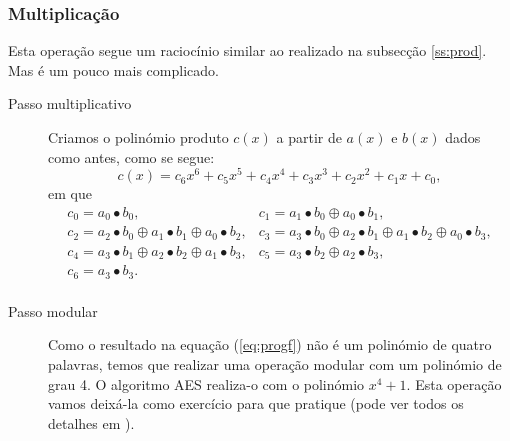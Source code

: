 \subsubsection{Multiplicação}\label{ss:prodraro}
Esta operação segue um raciocínio similar ao realizado na subsecção \ref{ss:prod}. Mas é um pouco mais complicado.
\begin{description}
\item[Passo multiplicativo] Criamos o polinómio produto $c(x)$ a partir de $a(x)$ e $b(x)$ dados como antes, como se segue:
$$
c(x)=c_6x^6+c_5x^5+c_4 x^4+c_3 x^3 +c_2 x^2 +c_1 x+c_0,
$$
em que
\begin{equation}\label{eq:progf}
\begin{array}{ll}
c_0= a_0 \bullet b_0, & c_1=a_1\bullet b_0 \oplus a_0 \bullet b_1,\\
c_2=a_2\bullet b_0 \oplus a_1 \bullet b_1 \oplus a_0 \bullet b_2 , & c_3= a_3\bullet b_0 \oplus a_2 \bullet b_1 \oplus a_1 \bullet b_2 \oplus a_0\bullet b_3,\\
c_4=a_3\bullet b_1 \oplus a_2 \bullet b_2 \oplus a_1 \bullet b_3, &  c_5=a_3\bullet b_2 \oplus a_2 \bullet b_3,\\
c_6=a_3\bullet b_3. & \\   
\end{array}
\end{equation}
\item[Passo modular] Como o resultado na equação (\ref{eq:progf}) não é um polinómio de quatro palavras, temos que realizar uma operação modular com um polinómio de grau 4. O algoritmo AES realiza-o com o polinómio $x^4+1$. Esta operação vamos deixá-la como exercício para que pratique (pode ver todos os detalhes em \cite{Federal}).
\end{description}

